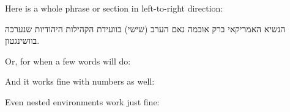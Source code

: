 \documentclass[12pt]{article}
\begin{document}
Here is a whole phrase or section in left-to-right direction:

\setRL
 הנשיא האמריקאי ברק אובמה נאם הערב (שישי) בוועידת הקהילות היהודיות שנערכה בוושינגטון.
\unsetRL

Or, for when a few words will do:


And it works fine with numbers as well:


Even nested environments work just fine:

\end{document}

